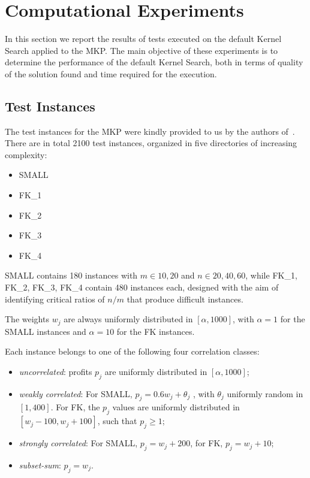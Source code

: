 \chapter{Computational Experiments}\label{ch:computational-experiments}
In this section we report the results of tests executed on the default Kernel Search applied to the MKP\@.
The main objective of these experiments is to determine the performance of the default Kernel Search,
both in terms of quality of the solution found and time required for the execution.


\section{Test Instances}
The test instances for the MKP were kindly provided to us by the authors of~\cite{mkp:2019}.\\
There are in total 2100 test instances, organized in
five directories of increasing complexity:
\begin{itemize}
    \item SMALL
    \item FK\_1
    \item FK\_2
    \item FK\_3
    \item FK\_4
\end{itemize}
SMALL contains 180 instances with \(m \in {10,20} \) and
\(n \in {20,40,60}\), while FK\_1, FK\_2, FK\_3, FK\_4 contain 480
instances each, designed with the aim of identifying critical ratios of
\(n/m\) that produce difficult instances.

The weights \(w_{j}\) are always uniformly distributed in \([\alpha, 1000]\), with \(\alpha = 1\) for the
SMALL instances and \(\alpha = 10\) for the FK instances.

Each instance belongs to one of the following four correlation classes:
\begin{itemize}
    \item \textit{uncorrelated}: profits \(p_{j}\) are uniformly distributed in \([\alpha,1000]\);
    \item \textit{weakly correlated}: For SMALL, \(p_{j} = 0.6 w_{j} + \theta_{j}\) , with \(\theta_{j}\) uniformly random in
    \([1, 400]\).
    For FK, the \(p_{j}\) values are uniformly distributed in \([w_{j} - 100, w_{j} + 100]\), such that \(p_{j} \geq 1\);
    \item \textit{strongly correlated}: For SMALL, \(p_{j} = w_{j} + 200\), for FK, \(p_{j} = w_{j} + 10\);
    \item \textit{subset-sum}: \(p_{j} = w_{j}\).
\end{itemize}


